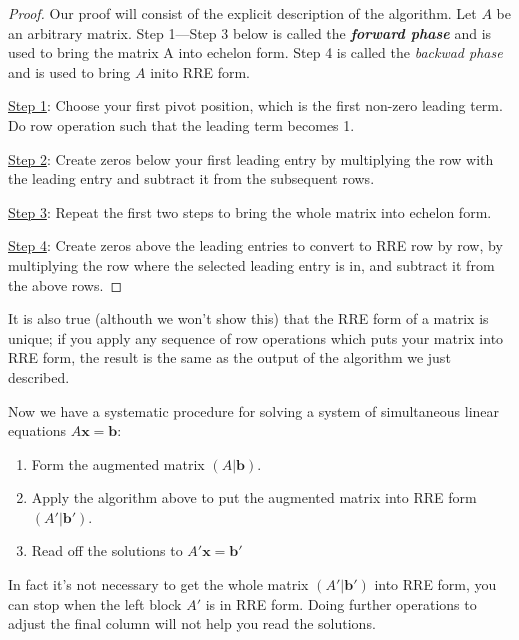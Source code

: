 \documentclass[12pt]{report}
\theoremstyle{definition}
\begin{document}
\begin{proof}
    Our proof will consist of the explicit description of the algorithm.
    Let $A$ be an arbitrary matrix.
    Step 1---Step 3 below is called the \textbf{\emph{forward phase}}
    and is used to bring the matrix A into echelon form.
    Step 4 is called the \emph{backwad phase}
    and is used to bring $A$ inito RRE form.

    \underline{Step 1}: Choose your first pivot position,
    which is the first non-zero leading term. Do row operation
    such that the leading term becomes 1.

    \underline{Step 2}: Create zeros below your first leading entry by
    multiplying the row with the leading entry and subtract it from the subsequent rows.

    \underline{Step 3}: Repeat the first two steps to bring the whole matrix into echelon form.

    \underline{Step 4}: Create zeros above the leading entries to convert to RRE row by row,
    by multiplying the row where the selected leading entry is in, and subtract it from the above rows.

\end{proof}

    \medskip
    It is also true (althouth we won't show this) that the RRE form of a matrix is unique;
    if you apply any sequence of row operations which puts your matrix into RRE form,
    the result is the same as the output of the algorithm we just described.

    Now we have a systematic procedure for solving a system of simultaneous linear equations
    $A\pmb{x} = \pmb{b}$:
    \begin{enumerate}[label = (\arabic*)]
        \item Form the augmented matrix $(A|\pmb{b})$.
        \item Apply the algorithm above to put the augmented matrix into RRE form $(A'|\pmb{b}')$.
        \item Read off the solutions to $A'\pmb{x} = \pmb{b}'$
    \end{enumerate}
    
    In fact it's not necessary to get the whole matrix $(A'|\pmb{b}')$ into RRE form, 
    you can stop when the left block $A'$ is in RRE form. Doing further operations to adjust
    the final column will not help you read the solutions.
\end{document}
